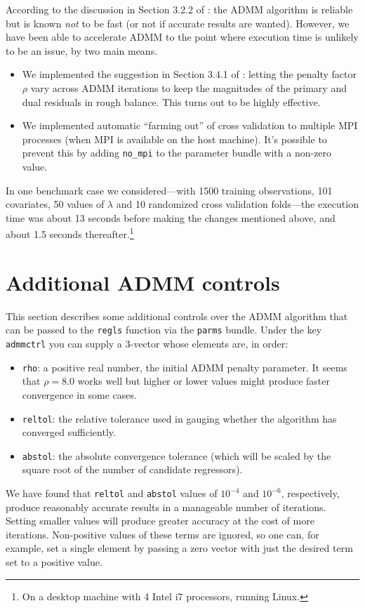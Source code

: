 \documentclass{article}
\begin{document}
According to the discussion in Section 3.2.2 of \cite{boyd2010}: the
ADMM algorithm is reliable but is known \textit{not} to be fast (or
not if accurate results are wanted). However, we have been able to
accelerate ADMM to the point where execution time is unlikely to be an
issue, by two main means.
\begin{itemize}
\item We implemented the suggestion in Section 3.4.1 of
  \cite{boyd2010}: letting the penalty factor $\rho$ vary across ADMM
  iterations to keep the magnitudes of the primary and dual residuals
  in rough balance. This turns out to be highly effective.
\item We implemented automatic ``farming out'' of cross validation to
  multiple \textsf{MPI} processes (when \textsf{MPI} is available on
  the host machine). It's possible to prevent this by adding
  \texttt{no\_mpi} to the parameter bundle with a non-zero value.
\end{itemize}
In one benchmark case we considered---with 1500 training observations,
101 covariates, 50 values of $\lambda$ and 10 randomized cross
validation folds---the execution time was about 13 seconds before
making the changes mentioned above, and about 1.5 seconds
thereafter.\footnote{On a desktop machine with 4 Intel i7 processors,
  running Linux.}

\section{Additional ADMM controls}
\label{sec:add-controls}

This section describes some additional controls over the ADMM
algorithm that can be passed to the \texttt{regls} function via the
\texttt{parms} bundle. Under the key \texttt{admmctrl} you can supply
a 3-vector whose elements are, in order:
\begin{itemize}
\item \texttt{rho}: a positive real number, the initial ADMM penalty
  parameter. It seems that $\rho = 8.0$ works well but higher or lower
  values might produce faster convergence in some cases.
\item \texttt{reltol}: the relative tolerance used in gauging whether
  the algorithm has converged sufficiently.
\item \texttt{abstol}: the absolute convergence tolerance (which will
  be scaled by the square root of the number of candidate regressors).
\end{itemize}
We have found that \texttt{reltol} and \texttt{abstol} values of
$10^{-4}$ and $10^{-6}$, respectively, produce reasonably accurate
results in a manageable number of iterations. Setting smaller values
will produce greater accuracy at the cost of more iterations.
Non-positive values of these terms are ignored, so one can, for
example, set a single element by passing a zero vector with just the
desired term set to a positive value.
\end{document}
